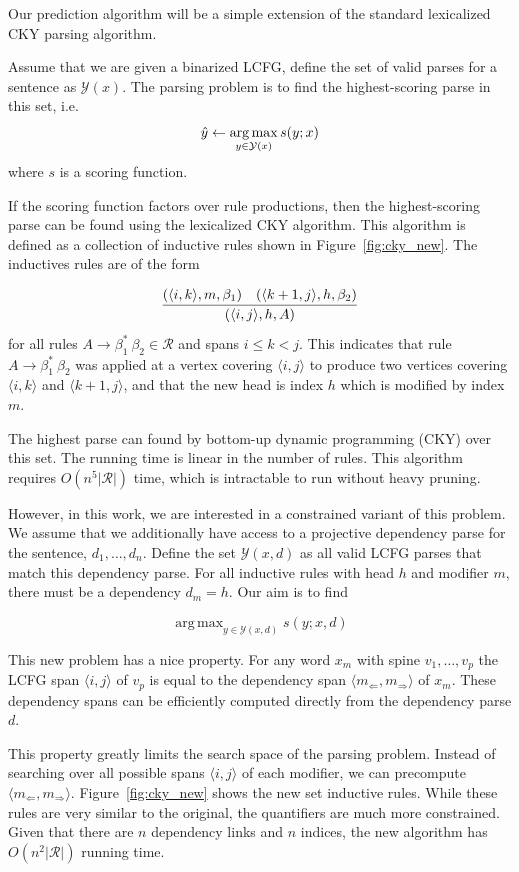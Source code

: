\documentclass[11pt,letterpaper]{article}
\DeclareMathOperator*{\argmax}{arg\,max}
\newcommand{\rules}{\mathcal{R}}
\newcommand{\Left}[1]{#1_{\Leftarrow}}
\newcommand{\Right}[1]{#1_{\Rightarrow}}
\newcommand{\Span}[1]{\langle #1 \rangle}
\newcommand{\RuleA}[3]{#1 \rightarrow #2^*\ #3}
\begin{document}
Our prediction algorithm will be a simple extension of the standard lexicalized CKY parsing algorithm.

Assume that we are given a binarized LCFG,
define the set of valid parses for a sentence as $\mathcal{Y}(x)$.
The parsing problem is to find the highest-scoring parse in this set, i.e.  \[ \hat{y} \gets \argmax_{y \in {\cal Y}(x)} s(y;x) \] where
$s$ is a scoring function.

If the scoring function factors over rule productions, then
the highest-scoring parse can be found using the lexicalized
CKY algorithm. This algorithm is defined as a
collection of inductive rules shown in Figure~\ref{fig:cky_new}.
The inductives rules are of the form

\[ \infer{(\Span{i, j}, h, A)}{(\Span{i, k}, m, \beta_1) & (\Span{k+1,
    j}, h, \beta_2)} \] for all rules $\RuleA{A}{\beta_1}{\beta_2}\in
\rules$ and spans $i \leq k < j$. This indicates that
rule $\RuleA{A}{\beta_1}{\beta_2}$ was applied at a vertex covering
$\Span{i, j}$ to produce two vertices covering $\Span{i, k}$ and
$\Span{k+1, j}$, and that the new head is index $h$ which is modified
by index $m$.

 The highest parse can found by bottom-up dynamic programming (CKY)
 over this set. The running time is linear in the
 number of rules. This algorithm requires $O(n^5 |\rules|)$ time, which is intractable to run without heavy pruning.

 However, in this work, we are interested in a constrained variant of
 this problem. We assume that we additionally have access to a
 projective dependency parse for the sentence, $d_1, \ldots, d_n$.
 Define the set $\mathcal{Y}(x,d)$ as all valid LCFG parses that match
 this dependency parse. For all inductive rules with head $h$ and modifier
$m$, there must be a dependency $d_m = h$.  Our aim is to find

\[ \argmax_{y \in \mathcal{Y}(x, d)} s(y; x, d)\]

This new problem has a nice property. For any word $x_m$ with spine $v_1, \ldots, v_p$ the LCFG span  $\Span{i,j}$ of $v_p$ is equal to the dependency span $\Span{\Left{m},\Right{m}}$ of $x_m$. These dependency spans can be efficiently computed directly from the dependency parse $d$.

This property greatly limits the search space of the parsing problem.
Instead of searching over all possible spans $\Span{i, j}$ of each modifier, we can
precompute $\langle \Left{m},\Right{m}\rangle$. Figure~\ref{fig:cky_new} shows the new set inductive rules.
While these rules are very similar to the original, the quantifiers are
much more constrained. Given that there are $n$ dependency links and $n$ indices, the new algorithm has $O(n^2|\rules|)$ running time.
\end{document}
